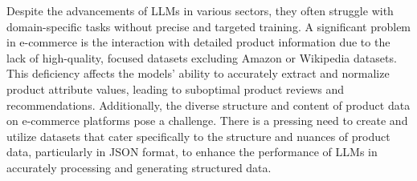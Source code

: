 \label{section:problema}
Despite the advancements of LLMs in various sectors, they often struggle with domain-specific tasks without precise and targeted training. A significant problem in e-commerce is the interaction with detailed product information due to the lack of high-quality, focused datasets excluding Amazon or Wikipedia datasets. This deficiency affects the models' ability to accurately extract and normalize product attribute values, leading to suboptimal product reviews and recommendations. Additionally, the diverse structure and content of product data on e-commerce platforms pose a challenge. There is a pressing need to create and utilize datasets that cater specifically to the structure and nuances of product data, particularly in JSON format, to enhance the performance of LLMs in accurately processing and generating structured data. 